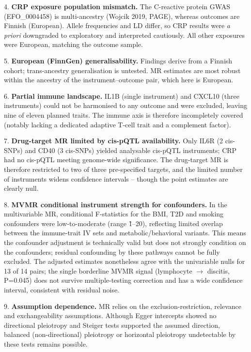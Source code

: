 \documentclass[11pt]{article}
\begin{document}
4. \textbf{CRP exposure population mismatch.} The C-reactive protein GWAS (EFO\_0004458) is multi-ancestry (Wojcik 2019, PAGE), whereas outcomes are Finnish (European). Allele frequencies and LD differ, so CRP results were \emph{a priori} downgraded to exploratory and interpreted cautiously. All other exposures were European, matching the outcome sample.

5. \textbf{European (FinnGen) generalisability.} Findings derive from a Finnish cohort; trans-ancestry generalisation is untested. MR estimates are most robust within the ancestry of the instrument--outcome pair, which here is European.

6. \textbf{Partial immune landscape.} IL1B (single instrument) and CXCL10 (three instruments) could not be harmonised to any outcome and were excluded, leaving nine of eleven planned traits. The immune axis is therefore incompletely covered (notably lacking a dedicated adaptive T-cell trait and a complement factor).

7. \textbf{Drug-target MR limited by cis-pQTL availability.} Only IL6R (2 cis-SNPs) and CD40 (3 cis-SNPs) yielded analysable cis-pQTL instruments; CRP had no cis-pQTL meeting genome-wide significance. The drug-target MR is therefore restricted to two of three pre-specified targets, and the limited number of instruments widens confidence intervals -- though the point estimates are clearly null.

8. \textbf{MVMR conditional instrument strength for confounders.} In the multivariable MR, conditional F-statistics for the BMI, T2D and smoking confounders were low-to-moderate (range \~1--20), reflecting limited overlap between the immune-trait IV sets and metabolic/behavioral variants. This means the confounder adjustment is technically valid but does not strongly condition on the confounders; residual confounding by these pathways cannot be fully excluded. The adjusted estimates nonetheless agree with the univariable nulls for 13 of 14 pairs; the single borderline MVMR signal (lymphocyte $\rightarrow$  discitis, P=0.045) does not survive multiple-testing correction and has a wide confidence interval, consistent with residual noise.

9. \textbf{Assumption dependence.} MR relies on the exclusion-restriction, relevance and exchangeability assumptions. Although Egger intercepts showed no directional pleiotropy and Steiger tests supported the assumed direction, balanced (non-directional) pleiotropy or horizontal pleiotropy undetectable by these tests remains possible.
\end{document}
